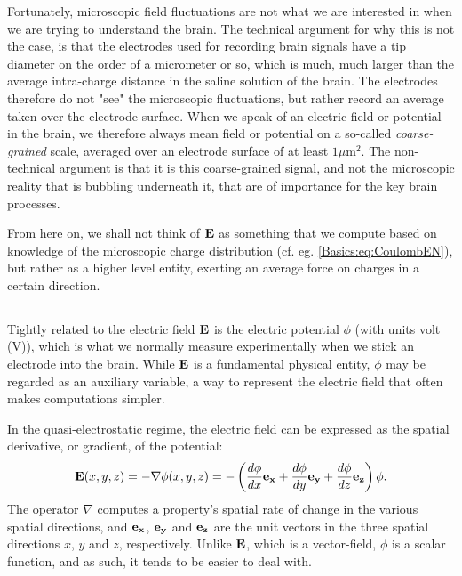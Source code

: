 Fortunately, microscopic field fluctuations are not what we are interested in when we are trying to understand the brain. The technical argument for why this is not the case, is that the electrodes used for recording brain signals have a tip diameter on the order of a micrometer or so, which is much, much larger than the average intra-charge distance in the saline solution of the brain. The electrodes therefore do not "see" the microscopic fluctuations, but rather record an average taken over the electrode surface. When we speak of an electric field or potential in the brain, we therefore always mean field or potential on a so-called \textit{coarse-grained} scale, averaged over an electrode surface of at least $1 \mu$m$^2$. The non-technical argument is that it is this coarse-grained signal, and not the microscopic reality that is bubbling underneath it, that are of importance for the key brain processes. 

From here on, we shall not think of ${\bf E}$ as something that we compute based on
knowledge of the microscopic charge distribution (cf. eg. \ref{Basics:eq:CoulombEN}), but rather as a higher level entity, exerting an average force on charges in a certain direction.


\subsection{}
Tightly related to the electric field ${\bf E}$ is the electric potential $\phi$ (with units volt (V)), which is what we normally measure experimentally when we stick an electrode into the brain. While ${\bf E}$ is a fundamental physical entity, $\phi$ may be regarded as an auxiliary variable, a way to represent the electric field that often makes computations simpler. 

In the quasi-electrostatic regime, the electric field can be expressed as the spatial derivative, or gradient, of the potential:
\begin{equation}
{\bf E}(x,y,z) = - \nabla \phi(x,y,z) = - \left(\frac{d\phi}{dx} {\bf e_x}  + \frac{d\phi}{dy} {\bf e_y} + \frac{d\phi}{dz} {\bf e_z} \right) \phi.
\label{Basics:eq:EV}
\end{equation}
The operator $\nabla$ computes a property's spatial rate of change in the various spatial directions, and ${\bf e_x}$, ${\bf e_y}$ and  ${\bf e_z}$ are the unit vectors in the three spatial directions $x$, $y$ and $z$, respectively. Unlike ${\bf E}$, which is a vector-field, $\phi$ is a scalar function, and as such, it tends to be easier to deal with.

